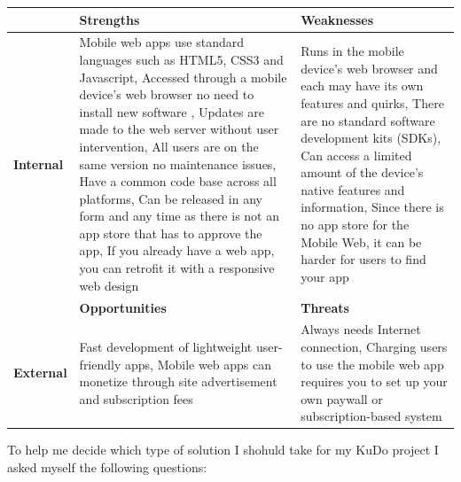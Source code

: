 \documentclass[a4paper,12pt]{book}
\begin{document}
\begin{center}
    \begin{tabular}{ | p{1.7cm} | p{6cm} | p{6cm} |}
    \hline
    & \textbf{Strengths} & \textbf{Weaknesses} \\ \hline
    \textbf{Internal} & 
    Mobile web apps use standard languages such as HTML5, CSS3 and Javascript, %
    Accessed through a mobile device’s web browser no need to install new software ,
    Updates are made to the web server without user intervention,
    All users are on the same version no maintenance issues,
    Have a common code base across all platforms,
    Can be released in any form and any time as there is not an app store that has to approve the app,
    If you already have a web app, you can retrofit it with a responsive web design
    & Runs in the mobile device’s web browser and each may have its own features and quirks, %
    There are no standard software development kits (SDKs), 
    Can access a limited amount of the device’s native features and information,
    Since there is no app store for the Mobile Web, it can be harder for users to find your app\\ \hline
    & \textbf{Opportunities} & \textbf{Threats} \\ \hline
    \textbf{External}  
    & Fast development of lightweight user-friendly apps, %
    Mobile web apps can monetize through site advertisement and subscription fees
    & Always needs Internet connection, %
    Charging users to use the mobile web app requires you to set up your own paywall or subscription-based system\\ \hline
    \end{tabular}
\end{center}

To help me decide which type of solution I shohuld take for my KuDo project I asked myself the following questions:
\end{document}
